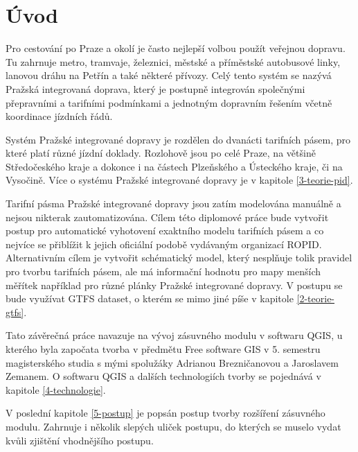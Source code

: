 \chapter*{Úvod}
\label{0-uvod}

Pro cestování po Praze a okolí je často nejlepší volbou použít veřejnou dopravu.
Tu zahrnuje metro, tramvaje, železnici, městské a příměstské autobusové linky,
lanovou dráhu na Petřín a také některé přívozy. Celý tento systém se nazývá 
Pražská integrovaná doprava, který je postupně integrován společnými přepravními
a tarifními podmínkami a jednotným dopravním řešením včetně koordinace jízdních řádů.

Systém Pražské integrované dopravy je rozdělen do dvanácti tarifních pásem, pro
které platí různé jízdní doklady. Rozlohově jsou po celé Praze, na většině
Středočeského kraje a dokonce i na částech Plzeňského a Ústeckého kraje, či na Vysočině.
Více o systému Pražské integrované dopravy je v kapitole \ref{3-teorie-pid}.

Tarifní pásma Pražské integrované dopravy jsou zatím modelována manuálně a nejsou
nikterak zautomatizována. Cílem této diplomové práce bude vytvořit postup pro
automatické vyhotovení exaktního modelu tarifních pásem a co nejvíce se přiblížit k jejich
oficiální podobě vydávaným organizací ROPID. Alternativním cílem je vytvořit schématický model, který nesplňuje tolik
pravidel pro tvorbu tarifních pásem, ale má informační hodnotu pro mapy menších měřítek
například pro různé plánky Pražské integrované dopravy. V postupu se bude využívat GTFS 
dataset, o kterém se mimo jiné píše v kapitole \ref{2-teorie-gtfs}.

Tato závěrečná práce navazuje na vývoj zásuvného modulu
v softwaru QGIS, u kterého byla započata tvorba v předmětu Free software GIS
v 5. semestru magisterského studia s mými spolužáky Adrianou Brezničanovou a Jaroslavem
Zemanem. O softwaru QGIS a dalších technologiích tvorby se pojednává v kapitole 
\ref{4-technologie}.

V poslední kapitole \ref{5-postup} je popsán postup tvorby rozšíření zásuvného modulu.
Zahrnuje i několik slepých uliček postupu, do kterých se muselo vydat kvůli zjištění
vhodnějšího postupu.    




